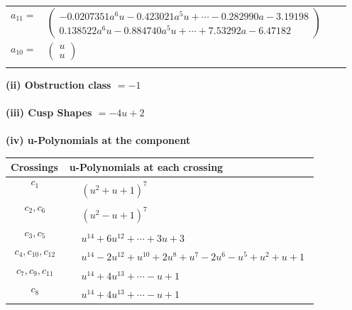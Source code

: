 \documentclass[1p]{elsarticle_modified}
\theoremstyle{definition}
\begin{document}
\begin{tabular}{m{7pt} m{180pt} m{7pt} m{180pt} }
\flushright $a_{11}=$&$\begin{pmatrix}-0.0207351 a^{6} u-0.423021 a^{5} u+\cdots-0.282990 a-3.19198\\0.138522 a^{6} u-0.884740 a^{5} u+\cdots+7.53292 a-6.47182\end{pmatrix}$ \\
\flushright $a_{10}=$&$\begin{pmatrix}u\\u\end{pmatrix}$\\&\end{tabular}
\flushleft \textbf{(ii) Obstruction class $= -1$}\\~\\
\flushleft \textbf{(iii) Cusp Shapes $= -4 u+2$}\\~\\
\newpage\renewcommand{\arraystretch}{1}
\flushleft \textbf{(iv) u-Polynomials at the component}\newline \\
\begin{tabular}{m{50pt}|m{274pt}}
Crossings & \hspace{64pt}u-Polynomials at each crossing \\
\hline $$\begin{aligned}c_{1}\end{aligned}$$&$\begin{aligned}
&(u^2+u+1)^7
\end{aligned}$\\
\hline $$\begin{aligned}c_{2},c_{6}\end{aligned}$$&$\begin{aligned}
&(u^2- u+1)^7
\end{aligned}$\\
\hline $$\begin{aligned}c_{3},c_{5}\end{aligned}$$&$\begin{aligned}
&u^{14}+6 u^{12}+\cdots+3 u+3
\end{aligned}$\\
\hline $$\begin{aligned}c_{4},c_{10},c_{12}\end{aligned}$$&$\begin{aligned}
&u^{14}-2 u^{12}+u^{10}+2 u^8+u^7-2 u^6- u^5+u^2+u+1
\end{aligned}$\\
\hline $$\begin{aligned}c_{7},c_{9},c_{11}\end{aligned}$$&$\begin{aligned}
&u^{14}+4 u^{13}+\cdots- u+1
\end{aligned}$\\
\hline $$\begin{aligned}c_{8}\end{aligned}$$&$\begin{aligned}
&u^{14}+4 u^{13}+\cdots- u+1
\end{aligned}$\\
\hline
\end{tabular}\\~\\
\end{document}
